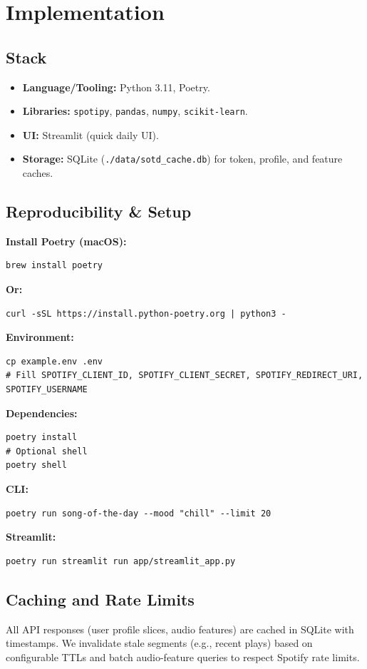 \documentclass[11pt]{article}
\begin{document}
\section{Implementation}
\subsection{Stack}
\begin{itemize}[leftmargin=*]
  \item \textbf{Language/Tooling:} Python 3.11, Poetry.
  \item \textbf{Libraries:} \texttt{spotipy}, \texttt{pandas}, \texttt{numpy}, \texttt{scikit-learn}.
  \item \textbf{UI:} Streamlit (quick daily UI).
  \item \textbf{Storage:} SQLite (\texttt{./data/sotd\_cache.db}) for token, profile, and feature caches.
\end{itemize}

\subsection{Reproducibility \& Setup}
\noindent\textbf{Install Poetry (macOS):}
\begin{verbatim}
brew install poetry
\end{verbatim}
\noindent\textbf{Or:}
\begin{verbatim}
curl -sSL https://install.python-poetry.org | python3 -
\end{verbatim}

\noindent\textbf{Environment:}
\begin{verbatim}
cp example.env .env
# Fill SPOTIFY_CLIENT_ID, SPOTIFY_CLIENT_SECRET, SPOTIFY_REDIRECT_URI, SPOTIFY_USERNAME
\end{verbatim}

\noindent\textbf{Dependencies:}
\begin{verbatim}
poetry install
# Optional shell
poetry shell
\end{verbatim}

\noindent\textbf{CLI:}
\begin{verbatim}
poetry run song-of-the-day --mood "chill" --limit 20
\end{verbatim}

\noindent\textbf{Streamlit:}
\begin{verbatim}
poetry run streamlit run app/streamlit_app.py
\end{verbatim}

\subsection{Caching and Rate Limits}
All API responses (user profile slices, audio features) are cached in SQLite with timestamps. We invalidate stale segments (e.g., recent plays) based on configurable TTLs and batch audio-feature queries to respect Spotify rate limits.
\end{document}
